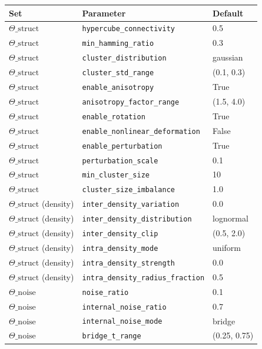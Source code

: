 \begin{tabular}{@{}lll@{}}
\toprule
Set & Parameter & Default \\
\midrule
$\Theta\_{\text{struct}}$ & \texttt{hypercube\_connectivity} & 0.5 \\
$\Theta\_{\text{struct}}$ & \texttt{min\_hamming\_ratio} & 0.3 \\
$\Theta\_{\text{struct}}$ & \texttt{cluster\_distribution} & gaussian \\
$\Theta\_{\text{struct}}$ & \texttt{cluster\_std\_range} & (0.1, 0.3) \\
$\Theta\_{\text{struct}}$ & \texttt{enable\_anisotropy} & True \\
$\Theta\_{\text{struct}}$ & \texttt{anisotropy\_factor\_range} & (1.5, 4.0) \\
$\Theta\_{\text{struct}}$ & \texttt{enable\_rotation} & True \\
$\Theta\_{\text{struct}}$ & \texttt{enable\_nonlinear\_deformation} & False \\
$\Theta\_{\text{struct}}$ & \texttt{enable\_perturbation} & True \\
$\Theta\_{\text{struct}}$ & \texttt{perturbation\_scale} & 0.1 \\
$\Theta\_{\text{struct}}$ & \texttt{min\_cluster\_size} & 10 \\
$\Theta\_{\text{struct}}$ & \texttt{cluster\_size\_imbalance} & 1.0 \\
$\Theta\_{\text{struct}}$ (density) & \texttt{inter\_density\_variation} & 0.0 \\
$\Theta\_{\text{struct}}$ (density) & \texttt{inter\_density\_distribution} & lognormal \\
$\Theta\_{\text{struct}}$ (density) & \texttt{inter\_density\_clip} & (0.5, 2.0) \\
$\Theta\_{\text{struct}}$ (density) & \texttt{intra\_density\_mode} & uniform \\
$\Theta\_{\text{struct}}$ (density) & \texttt{intra\_density\_strength} & 0.0 \\
$\Theta\_{\text{struct}}$ (density) & \texttt{intra\_density\_radius\_fraction} & 0.5 \\
$\Theta\_{\text{noise}}$ & \texttt{noise\_ratio} & 0.1 \\
$\Theta\_{\text{noise}}$ & \texttt{internal\_noise\_ratio} & 0.7 \\
$\Theta\_{\text{noise}}$ & \texttt{internal\_noise\_mode} & bridge \\
$\Theta\_{\text{noise}}$ & \texttt{bridge\_t\_range} & (0.25, 0.75) \\

\end{tabular}
